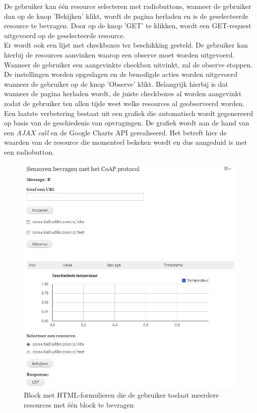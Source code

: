 De gebruiker kan \'{e}\'{e}n resource selecteren met radiobuttons, wanneer de gebruiker dan op de knop 'Bekijken' klikt, wordt de pagina herladen en is de geselecteerde resource te bevragen. Door op de knop 'GET' te klikken, wordt een GET-request uitgevoerd op de geselecteerde resource.\\
Er wordt ook een lijst met checkboxes ter beschikking gesteld. De gebruiker kan hierbij de resources aanvinken waarop een observe moet worden uitgevoerd. Wanneer de gebruiker een aangevinkte checkbox uitvinkt, zal de observe stoppen. De instellingen worden opgeslagen en de benodigde acties worden uitgevoerd wanneer de gebruiker op de knop 'Observe' klikt. Belangrijk hierbij is dat wanneer de pagina herladen wordt, de juiste checkboxes al worden aangevinkt zodat de gebruiker ten allen tijde weet welke resources al geobserveerd worden.\\
Een laatste verbetering bestaat uit een grafiek die automatisch wordt gegenereerd op basis van de geschiedenis van opvragingen. De grafiek wordt aan de hand van een \textit{AJAX call} en de Google Charts API \cite{googleCharts} gerealiseerd. Het betreft hier de waarden van de resource die momenteel bekeken wordt en dus aangeduid is met een radiobutton.

\begin{figure}[h!]
\centering
\includegraphics[width=1\textwidth]{fig/meerdere_resources}
\caption{Block met HTML-formulieren die de gebruiker toelaat meerdere resources met \'{e}\'{e}n block te bevragen}
\label{fig:meerdereResources}
\end{figure}

